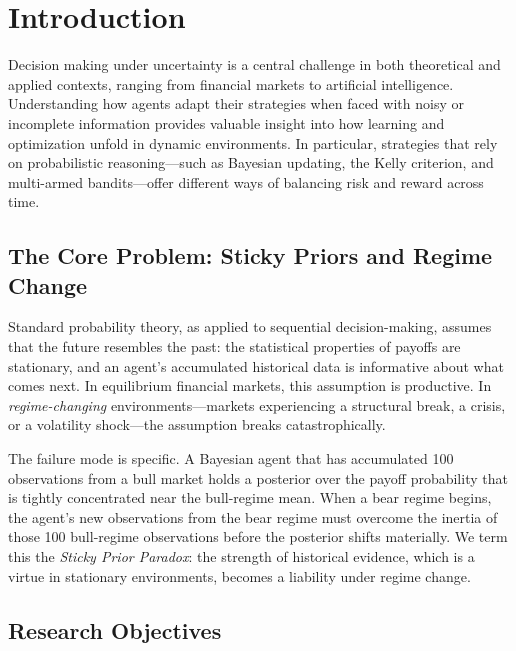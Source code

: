 \chapter{Introduction}
\label{ch:introduction}

Decision making under uncertainty is a central challenge in both theoretical
and applied contexts, ranging from financial markets to artificial
intelligence. Understanding how agents adapt their strategies when faced with
noisy or incomplete information provides valuable insight into how learning
and optimization unfold in dynamic environments. In particular, strategies
that rely on probabilistic reasoning---such as Bayesian updating, the Kelly
criterion, and multi-armed bandits---offer different ways of balancing risk
and reward across time.

\section{The Core Problem: Sticky Priors and Regime Change}

Standard probability theory, as applied to sequential decision-making,
assumes that the future resembles the past: the statistical properties of
payoffs are stationary, and an agent's accumulated historical data is
informative about what comes next. In equilibrium financial markets, this
assumption is productive. In \emph{regime-changing} environments---markets
experiencing a structural break, a crisis, or a volatility shock---the
assumption breaks catastrophically.

The failure mode is specific. A Bayesian agent that has accumulated 100
observations from a bull market holds a posterior over the payoff probability
that is tightly concentrated near the bull-regime mean. When a bear regime
begins, the agent's new observations from the bear regime must overcome
the inertia of those 100 bull-regime observations before the posterior
shifts materially. We term this the \emph{Sticky Prior Paradox}: the
strength of historical evidence, which is a virtue in stationary environments,
becomes a liability under regime change.

\section{Research Objectives}


